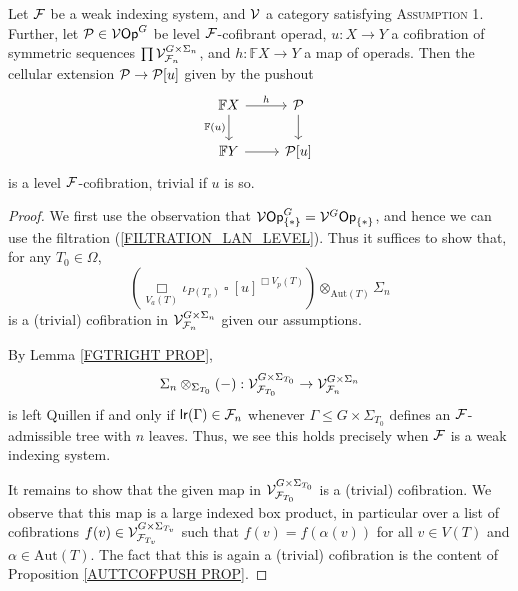\documentclass[a4paper,10pt]{article}%
\begin{document}
\begin{proposition}
  \label{CELLULAR_EXTENSION_COFIBRATION_THEOREM}
  Let $\F$ be a weak indexing system, and $\V$ a category satisfying \textsc{Assumption 1}. Further, let $\P\in \V\Op^G$ be level $\F$-cofibrant operad, $u: X \to Y$ a cofibration of symmetric sequences $\prod\V_{\F_n}^{G\times \Sigma_n}$, and $h: \mathbb F X \to Y$ a map of operads. Then the cellular extension $\P \to \P[u]$ given by the pushout
  \[
  \begin{tikzcd}
    \mathbb F X \arrow[d, "\mathbb F(u)"'] \arrow[r, "h"] & \P \arrow[d] \\
    \mathbb F Y \arrow[r] & \P[u]
  \end{tikzcd}
  \]
  is a level $\F$-cofibration, trivial if $u$ is so. 
\end{proposition}
\begin{proof}
  We first use the observation that $\V\Op^G_{\set *} = \V^G\Op_{\set *}$, and hence we can use the filtration (\ref{FILTRATION_LAN_LEVEL}). Thus it suffices to show that, for any $T_0 \in \Omega$,
  \[
  \left(\mathop{\Box}\limits_{V_a(T)}\iota_{P(T_v)}\ \square\ [u]^{\Box V_p(T)} \right) \otimes_{\mathrm{Aut}(T)}\Sigma_n
  \]
  is a (trivial) cofibration in $\V^{G\times \Sigma_n}_{\F_n}$ given our assumptions. 

  By Lemma \ref{FGTRIGHT PROP}, 
  \[
  \Sigma_n \otimes_{\Sigma_{T_0}}(-): \V^{G \times \Sigma_{T_0}}_{\F_{T_0}} \to \V_{\F_n}^{G \times \Sigma_n}
  \]
  is left Quillen if and only if $\mathsf{lr}(\Gamma) \in \F_n$ whenever $\Gamma \leq G \times \Sigma_{T_0}$ defines an $\F$-admissible tree with $n$ leaves. Thus, we see this holds precisely when $\F$ is a weak indexing system. 

  It remains to show that the given map in $\V^{G\times \Sigma_{T_0}}_{\F_{T_0}}$ is a (trivial) cofibration. We observe that this map is a large indexed box product, in particular over a list of cofibrations $f(v) \in \V^{G \times \Sigma_{T_v}}_{\F_{T_v}}$ such that $f(v) = f(\alpha(v))$ for all $v\in V(T)$ and $\alpha \in \mathrm{Aut}(T)$. The fact that this is again a (trivial) cofibration is the content of Proposition \ref{AUTTCOFPUSH PROP}.
\end{proof}
\end{document}
